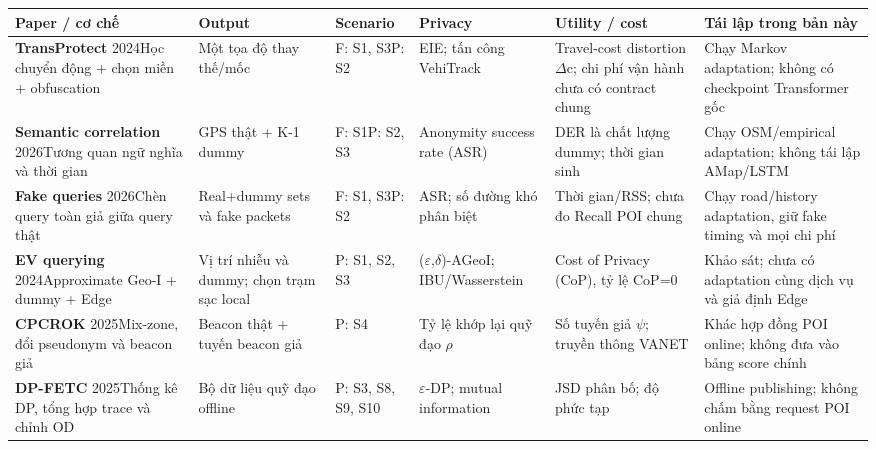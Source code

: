 \par\smallskip\noindent\begin{tabularx}{\linewidth}{@{}P{2.75cm}P{2.15cm}P{1.6cm}P{2.4cm}P{2.5cm}Y@{}}\toprule
\textbf{Paper / cơ chế} & \textbf{Output} & \textbf{Scenario} & \textbf{Privacy} & \textbf{Utility / cost} & \textbf{Tái lập trong bản này} \\
\midrule
\textbf{TransProtect} 2024\cite{transprotect}\newline Học chuyển động + chọn miền + obfuscation & Một tọa độ thay thế/mốc & F: S1, S3\newline P: S2 & EIE; tấn công VehiTrack & Travel-cost distortion $\Delta$c; chi phí vận hành chưa có contract chung & Chạy Markov adaptation; không có checkpoint Transformer gốc \\
\textbf{Semantic correlation} 2026\cite{semantic}\newline Tương quan ngữ nghĩa và thời gian & GPS thật + K-1 dummy & F: S1\newline P: S2, S3 & Anonymity success rate (ASR) & DER là chất lượng dummy; thời gian sinh & Chạy OSM/empirical adaptation; không tái lập AMap/LSTM \\
\textbf{Fake queries} 2026\cite{fake}\newline Chèn query toàn giả giữa query thật & Real+dummy sets và fake packets & F: S1, S3\newline P: S2 & ASR; số đường khó phân biệt & Thời gian/RSS; chưa đo Recall POI chung & Chạy road/history adaptation, giữ fake timing và mọi chi phí \\
\textbf{EV querying} 2024\cite{ev}\newline Approximate Geo-I + dummy + Edge & Vị trí nhiễu và dummy; chọn trạm sạc local & P: S1, S2, S3 & ($\varepsilon$,$\delta$)-AGeoI; IBU/Wasserstein & Cost of Privacy (CoP), tỷ lệ CoP=0 & Khảo sát; chưa có adaptation cùng dịch vụ và giả định Edge \\
\textbf{CPCROK} 2025\cite{cpcrok}\newline Mix-zone, đổi pseudonym và beacon giả & Beacon thật + tuyến beacon giả & P: S4 & Tỷ lệ khớp lại quỹ đạo $\rho$ & Số tuyến giả $\psi$; truyền thông VANET & Khác hợp đồng POI online; không đưa vào bảng score chính \\
\textbf{DP-FETC} 2025\cite{dpfetc}\newline Thống kê DP, tổng hợp trace và chỉnh OD & Bộ dữ liệu quỹ đạo offline & P: S3, S8, S9, S10 & $\varepsilon$-DP; mutual information & JSD phân bố; độ phức tạp & Offline publishing; không chấm bằng request POI online \\

\end{tabularx}
